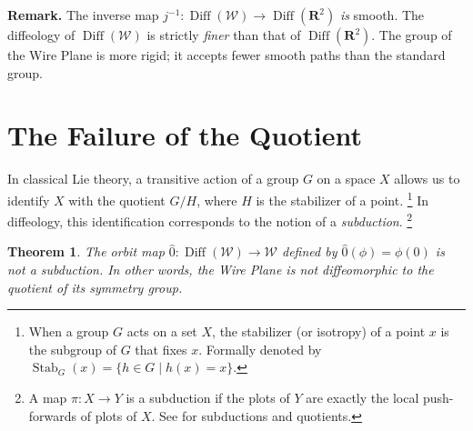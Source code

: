 \documentclass[10pt,letterpaper,reqno]{amsart}
\newcommand{\RR}{\mathbf{R}}
\newcommand{\cW}{\mathcal{W}}
\DeclareMathOperator{\Diff}{Diff}
\DeclareMathOperator{\stab}{Stab}
\newtheorem{theorem}{Theorem} %
\begin{document}
  \textbf{Remark.}
  The inverse map $j^{-1}: \Diff(\cW) \to \Diff(\RR^2)$ \emph{is} smooth.
  The diffeology of $\Diff(\cW)$ is strictly \emph{finer} than that of $\Diff(\RR^2)$.
  The group of the Wire Plane is more rigid;
  it accepts fewer smooth paths than the standard group.
  
  
  \section{The Failure of the Quotient}
  
  In classical Lie theory,
  a transitive action of a group $G$ on a space $X$ allows us to identify $X$ with the quotient $G/H$,
  where $H$ is the stabilizer of a point.%
  \footnote{When a group $G$ acts on a set $X$,
  the stabilizer (or isotropy) of a point $x$ is the subgroup of $G$ that fixes $x$.
  Formally denoted by $\stab_G(x) = \{ h \in G \mid h(x) = x \}$.}
  In diffeology,
  this identification corresponds to the notion of a \emph{subduction}.%
  \footnote{A map $\pi: X \to Y$ is a subduction if the plots of $Y$ are exactly the local push-forwards of plots of $X$. See \cite[ and 1.50]{PIZ13} for subductions and quotients.}
  
  \begin{theorem}
    The orbit map $\hat{0}: \Diff(\cW) \to \cW$ defined by $\hat{0}(\phi) = \phi(0)$ is not a subduction.
    In other words,
    the Wire Plane is not diffeomorphic to the quotient of its symmetry group.
  \end{theorem}
  
\end{document}
